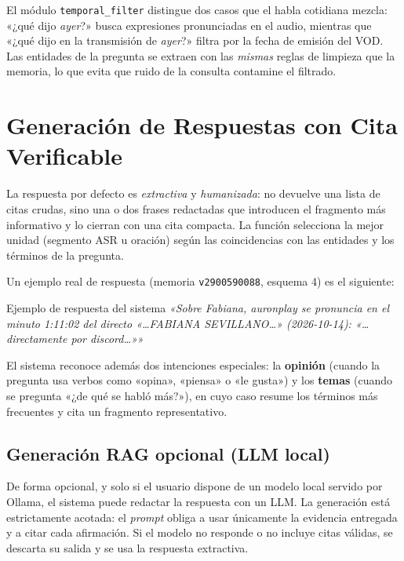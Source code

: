 \documentclass[12pt,a4paper]{article}
\begin{document}
El módulo \texttt{temporal\_filter} distingue dos casos que el habla cotidiana mezcla: «¿qué dijo \emph{ayer}?» busca expresiones pronunciadas en el audio, mientras que «¿qué dijo en la transmisión de \emph{ayer}?» filtra por la fecha de emisión del VOD. Las entidades de la pregunta se extraen con las \emph{mismas} reglas de limpieza que la memoria, lo que evita que ruido de la consulta contamine el filtrado.

\section{Generación de Respuestas con Cita Verificable}
\label{sec:respuestas}

La respuesta por defecto es \emph{extractiva} y \emph{humanizada}: no devuelve una lista de citas crudas, sino una o dos frases redactadas que introducen el fragmento más informativo y lo cierran con una cita compacta. La función selecciona la mejor unidad (segmento ASR u oración) según las coincidencias con las entidades y los términos de la pregunta.


Un ejemplo real de respuesta (memoria \texttt{v2900590088}, esquema 4) es el siguiente:

\begin{cajapln}{Ejemplo de respuesta del sistema}
\textit{«Sobre Fabiana, auronplay se pronuncia en el minuto 1:11:02 del directo «\ldots FABIANA SEVILLANO\ldots» (2026-10-14): «\ldots directamente por discord\ldots»»}
\end{cajapln}

El sistema reconoce además dos intenciones especiales: la \textbf{opinión} (cuando la pregunta usa verbos como «opina», «piensa» o «le gusta») y los \textbf{temas} (cuando se pregunta «¿de qué se habló más?»), en cuyo caso resume los términos más frecuentes y cita un fragmento representativo.

\subsection{Generación RAG opcional (LLM local)}

De forma opcional, y solo si el usuario dispone de un modelo local servido por Ollama, el sistema puede redactar la respuesta con un LLM. La generación está estrictamente acotada: el \emph{prompt} obliga a usar únicamente la evidencia entregada y a citar cada afirmación. Si el modelo no responde o no incluye citas válidas, se descarta su salida y se usa la respuesta extractiva.
\end{document}
